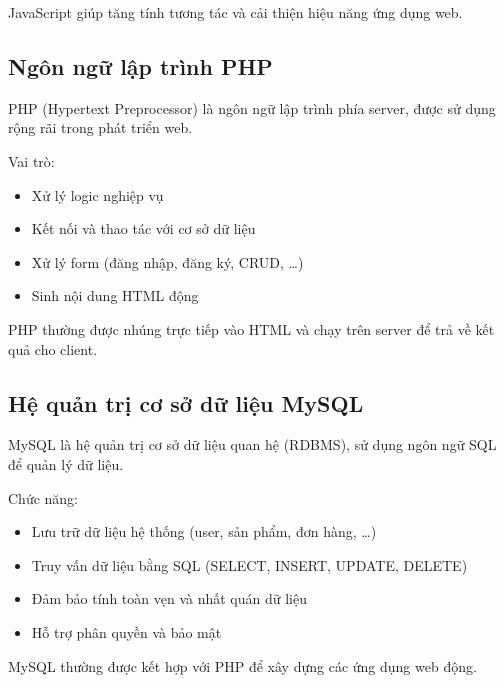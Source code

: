 \documentclass[pt = 12,a4paper]{article}
\begin{document}
JavaScript giúp tăng tính tương tác và cải thiện hiệu năng ứng dụng web.

\subsection{Ngôn ngữ lập trình PHP}
PHP (Hypertext Preprocessor) là ngôn ngữ lập trình phía server, được sử dụng rộng rãi trong phát triển web.

Vai trò:
\begin{itemize}
    \item Xử lý logic nghiệp vụ
    \item Kết nối và thao tác với cơ sở dữ liệu
    \item Xử lý form (đăng nhập, đăng ký, CRUD, \ldots)
    \item Sinh nội dung HTML động
\end{itemize}

PHP thường được nhúng trực tiếp vào HTML và chạy trên server để trả về kết quả cho client.

\subsection{Hệ quản trị cơ sở dữ liệu MySQL}
MySQL là hệ quản trị cơ sở dữ liệu quan hệ (RDBMS), sử dụng ngôn ngữ SQL để quản lý dữ liệu.

Chức năng:
\begin{itemize}
    \item Lưu trữ dữ liệu hệ thống (user, sản phẩm, đơn hàng, \ldots)
    \item Truy vấn dữ liệu bằng SQL (SELECT, INSERT, UPDATE, DELETE)
    \item Đảm bảo tính toàn vẹn và nhất quán dữ liệu
    \item Hỗ trợ phân quyền và bảo mật
\end{itemize}

MySQL thường được kết hợp với PHP để xây dựng các ứng dụng web động.


\end{document}
